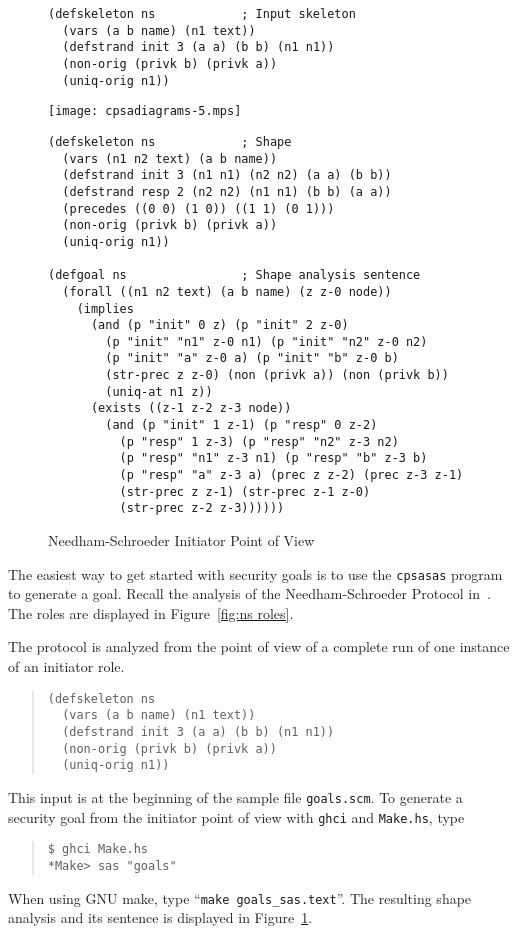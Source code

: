 \documentclass[12pt]{article}
\begin{document}
\begin{figure}
\begin{verbatim}
(defskeleton ns            ; Input skeleton
  (vars (a b name) (n1 text))
  (defstrand init 3 (a a) (b b) (n1 n1))
  (non-orig (privk b) (privk a))
  (uniq-orig n1))
\end{verbatim}
\begin{center}
\texttt{[image: cpsadiagrams-5.mps]}
\end{center}
\begin{verbatim}
(defskeleton ns            ; Shape
  (vars (n1 n2 text) (a b name))
  (defstrand init 3 (n1 n1) (n2 n2) (a a) (b b))
  (defstrand resp 2 (n2 n2) (n1 n1) (b b) (a a))
  (precedes ((0 0) (1 0)) ((1 1) (0 1)))
  (non-orig (privk b) (privk a))
  (uniq-orig n1))

(defgoal ns                ; Shape analysis sentence
  (forall ((n1 n2 text) (a b name) (z z-0 node))
    (implies
      (and (p "init" 0 z) (p "init" 2 z-0)
        (p "init" "n1" z-0 n1) (p "init" "n2" z-0 n2)
        (p "init" "a" z-0 a) (p "init" "b" z-0 b)
        (str-prec z z-0) (non (privk a)) (non (privk b))
        (uniq-at n1 z))
      (exists ((z-1 z-2 z-3 node))
        (and (p "init" 1 z-1) (p "resp" 0 z-2)
          (p "resp" 1 z-3) (p "resp" "n2" z-3 n2)
          (p "resp" "n1" z-3 n1) (p "resp" "b" z-3 b)
          (p "resp" "a" z-3 a) (prec z z-2) (prec z-3 z-1)
          (str-prec z z-1) (str-prec z-1 z-0)
          (str-prec z-2 z-3))))))
\end{verbatim}
\caption{Needham-Schroeder Initiator Point of View}
\label{fig:ns init}
\end{figure}

The easiest way to get started with security goals is to use the
\texttt{cpsasas} program to generate a goal.  Recall the analysis of
the Needham-Schroeder Protocol in~\cite[Section~10]{cpsaprimer09}.
The roles are displayed in Figure~\ref{fig:ns roles}.

The protocol is analyzed from the point of view of a complete run of
one instance of an initiator role.

\begin{quote}
\begin{verbatim}
(defskeleton ns
  (vars (a b name) (n1 text))
  (defstrand init 3 (a a) (b b) (n1 n1))
  (non-orig (privk b) (privk a))
  (uniq-orig n1))
\end{verbatim}
\end{quote}

This {\cpsa} input is at the beginning of the sample file
\texttt{goals.scm}.  To generate a security goal from the initiator
point of view with \texttt{ghci} and \texttt{Make.hs}, type
\begin{quote}
\begin{verbatim}
$ ghci Make.hs
*Make> sas "goals"
\end{verbatim}
\end{quote}
When using GNU make, type ``\texttt{make goals\_sas.text}''.  The
resulting shape analysis and its sentence is displayed in
Figure~\ref{fig:ns init}.
\end{document}
